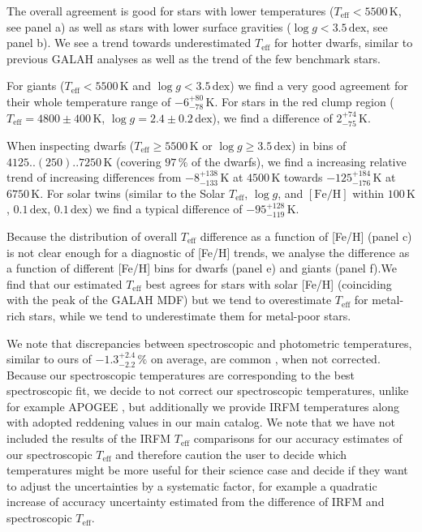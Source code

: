\documentclass[fleqn,usenatbib,useAMS]{mnras}
\newcommand{\Teff}{$T_\mathrm{eff}$\xspace}
\newcommand{\logg}{$\log g$\xspace}
\newcommand{\feh}{$\mathrm{[Fe/H]}$\xspace}
\begin{document}
The overall agreement is good for stars with lower temperatures ($T_\text{eff} < 5500\,\mathrm{K}$, see panel a) as well as stars with lower surface gravities ($\log g < 3.5\,\mathrm{dex}$, see panel b). We see a trend towards underestimated \Teff for hotter dwarfs, similar to previous GALAH analyses as well as the trend of the few benchmark stars.

For giants ($T_\text{eff} < 5500\,\mathrm{K}$ and $\log g < 3.5\,\mathrm{dex}$) we find a very good agreement for their whole temperature range of $-6_{-78}^{+80}\,\mathrm{K}$. For stars in the red clump region ($T_\text{eff} = 4800\pm400\,\mathrm{K}$, $\log g = 2.4\pm0.2\,\mathrm{dex}$), we find a difference of $2_{-75}^{+74}\,\mathrm{K}$.

When inspecting dwarfs ($T_\text{eff} \geq 5500\,\mathrm{K}$ or $\log g \geq 3.5\,\mathrm{dex}$) in bins of $4125..(250)..7250\,\mathrm{K}$ 
(covering $97\,\%$ of the dwarfs), we find a increasing relative trend of increasing differences from $-8_{-133}^{+138}\,\mathrm{K}$ at $4500\,\mathrm{K}$ towards $-125_{-176}^{+184}\,\mathrm{K}$ at $6750\,\mathrm{K}$. For solar twins (similar to the Solar \Teff, \logg, and \feh within $100\,\mathrm{K}$, $0.1\,\mathrm{dex}$, $0.1\,\mathrm{dex}$) we find a typical difference of $-95_{-119}^{+128}\,\mathrm{K}$.

Because the distribution of overall \Teff difference as a function of [Fe/H] (panel c) is not clear enough for a diagnostic of [Fe/H] trends, we analyse the difference as a function of different [Fe/H] bins for dwarfs (panel e) and giants (panel f).We find that our estimated \Teff best agrees for stars with solar [Fe/H] (coinciding with the peak of the GALAH MDF) but we tend to overestimate \Teff for metal-rich stars, while we tend to underestimate them for metal-poor stars.

We note that discrepancies between spectroscopic and photometric temperatures, similar to ours of $-1.3_{-2.2}^{+2.4}\,\%$ on average, are common \citep[see e.g.][]{Meszaros2013}, when not corrected. Because our spectroscopic temperatures are corresponding to the best spectroscopic fit, we decide to not correct our spectroscopic temperatures, unlike for example APOGEE \citep{Joensson2020}, but additionally we provide IRFM temperatures along with adopted reddening values in our main catalog. We note that we have not included the results of the IRFM \Teff comparisons for our accuracy estimates of our spectroscopic \Teff and therefore caution the user to decide which temperatures might be more useful for their science case and decide if they want to adjust the uncertainties by a systematic factor, for example a quadratic increase of accuracy uncertainty estimated from the difference of IRFM and spectroscopic \Teff.
\end{document}
